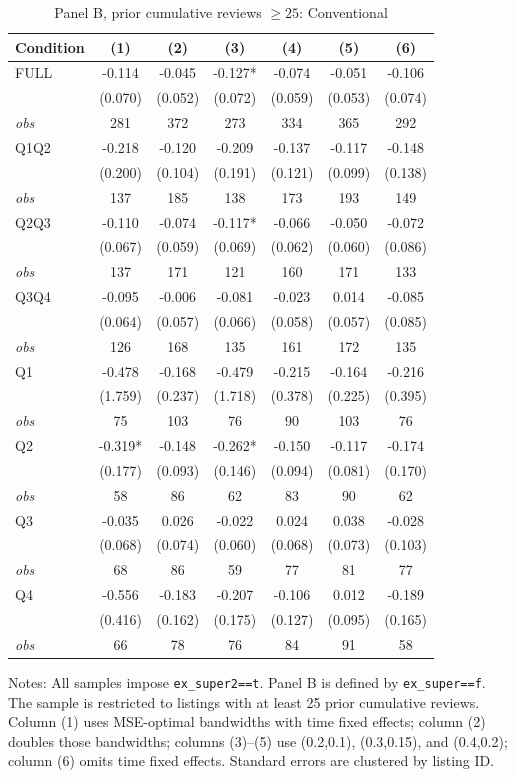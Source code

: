 \begin{table}[!htbp]
\centering
\caption{Panel B, prior cumulative reviews $\geq25$: Conventional}
\begin{tabular}{lcccccc}
\toprule
Condition & (1) & (2) & (3) & (4) & (5) & (6) \\
\midrule
FULL & -0.114 & -0.045 & -0.127* & -0.074 & -0.051 & -0.106 \\
 & (0.070) & (0.052) & (0.072) & (0.059) & (0.053) & (0.074) \\
\textit{obs} & 281 & 372 & 273 & 334 & 365 & 292 \\
Q1Q2 & -0.218 & -0.120 & -0.209 & -0.137 & -0.117 & -0.148 \\
 & (0.200) & (0.104) & (0.191) & (0.121) & (0.099) & (0.138) \\
\textit{obs} & 137 & 185 & 138 & 173 & 193 & 149 \\
Q2Q3 & -0.110 & -0.074 & -0.117* & -0.066 & -0.050 & -0.072 \\
 & (0.067) & (0.059) & (0.069) & (0.062) & (0.060) & (0.086) \\
\textit{obs} & 137 & 171 & 121 & 160 & 171 & 133 \\
Q3Q4 & -0.095 & -0.006 & -0.081 & -0.023 & 0.014 & -0.085 \\
 & (0.064) & (0.057) & (0.066) & (0.058) & (0.057) & (0.085) \\
\textit{obs} & 126 & 168 & 135 & 161 & 172 & 135 \\
Q1 & -0.478 & -0.168 & -0.479 & -0.215 & -0.164 & -0.216 \\
 & (1.759) & (0.237) & (1.718) & (0.378) & (0.225) & (0.395) \\
\textit{obs} & 75 & 103 & 76 & 90 & 103 & 76 \\
Q2 & -0.319* & -0.148 & -0.262* & -0.150 & -0.117 & -0.174 \\
 & (0.177) & (0.093) & (0.146) & (0.094) & (0.081) & (0.170) \\
\textit{obs} & 58 & 86 & 62 & 83 & 90 & 62 \\
Q3 & -0.035 & 0.026 & -0.022 & 0.024 & 0.038 & -0.028 \\
 & (0.068) & (0.074) & (0.060) & (0.068) & (0.073) & (0.103) \\
\textit{obs} & 68 & 86 & 59 & 77 & 81 & 77 \\
Q4 & -0.556 & -0.183 & -0.207 & -0.106 & 0.012 & -0.189 \\
 & (0.416) & (0.162) & (0.175) & (0.127) & (0.095) & (0.165) \\
\textit{obs} & 66 & 78 & 76 & 84 & 91 & 58 \\
\bottomrule
\end{tabular}
\begin{minipage}{0.98\textwidth}\footnotesize
Notes: All samples impose \texttt{ex\_super2==t}. Panel B is defined by \texttt{ex\_super==f}. The sample is restricted to listings with at least 25 prior cumulative reviews. Column (1) uses MSE-optimal bandwidths with time fixed effects; column (2) doubles those bandwidths; columns (3)--(5) use (0.2,0.1), (0.3,0.15), and (0.4,0.2); column (6) omits time fixed effects. Standard errors are clustered by listing ID.
\end{minipage}
\end{table}
